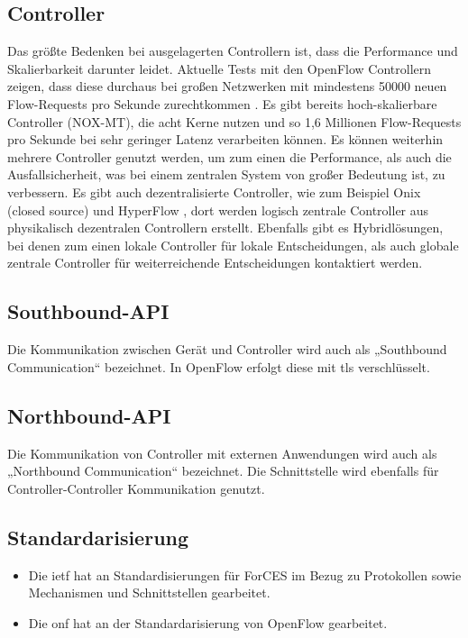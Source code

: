 \documentclass[twoside,12pt]{scrartcl}
\begin{document}
		\subsection{Controller}
Das größte Bedenken bei ausgelagerten Controllern ist, dass die Performance und Skalierbarkeit darunter leidet. Aktuelle Tests mit den OpenFlow Controllern zeigen, dass diese durchaus bei großen Netzwerken mit mindestens 50000 neuen Flow-Requests pro Sekunde zurechtkommen \cite{nox-mt}. Es gibt bereits hoch-skalierbare Controller (NOX-MT), die acht Kerne nutzen und so 1,6 Millionen Flow-Requests pro Sekunde bei sehr geringer Latenz verarbeiten können. Es können weiterhin mehrere Controller genutzt werden, um zum einen die Performance, als auch die Ausfallsicherheit, was bei einem zentralen System von großer Bedeutung ist, zu verbessern. Es gibt auch dezentralisierte Controller, wie zum Beispiel Onix (closed source) und HyperFlow \cite{hyperflow}, dort werden logisch zentrale Controller aus physikalisch dezentralen Controllern erstellt. Ebenfalls gibt es Hybridlösungen, bei denen zum einen lokale Controller für lokale Entscheidungen, als auch globale zentrale Controller für weiterreichende Entscheidungen kontaktiert werden.
		\subsection{Southbound-API}
Die Kommunikation zwischen Gerät und Controller wird auch als „Southbound Communication“ bezeichnet. In OpenFlow erfolgt diese mit \gls{tls} verschlüsselt.
		\subsection{Northbound-API}
Die Kommunikation von Controller mit externen Anwendungen  wird auch als „Northbound Communication“ bezeichnet. Die Schnittstelle wird ebenfalls für Controller-Controller Kommunikation genutzt.
		\subsection{Standardarisierung}
		\begin{itemize}
			\item Die \gls{ietf} hat an Standardisierungen für ForCES im Bezug zu Protokollen sowie Mechanismen und Schnittstellen gearbeitet.
			\item Die \gls{onf} hat an der Standardarisierung von OpenFlow gearbeitet.
		\end{itemize}
\end{document}
